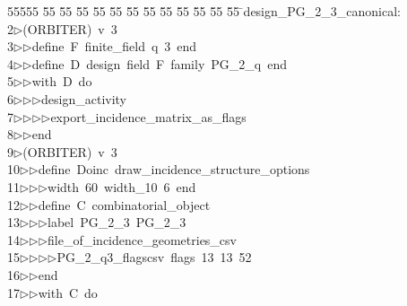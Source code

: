 %
%
\begin{tabbing}
55555 \= 55 \= 55 \= 55 \= 55 \= 55 \= 55 \= 55 \= 55 \= 55 \= 55 \= 55 \= 55 \= \>design\_PG\_2\_3\_canonical:\ \\[0pt]
2\>$\triangleright$\>(ORBITER)\ v\ 3\ \\[0pt]
3\>$\triangleright$\>$\triangleright$\>define\ F\ finite\_field\ q\ 3\ end\ \\[0pt]
4\>$\triangleright$\>$\triangleright$\>define\ D\ design\ field\ F\ family\ PG\_2\_q\ end\ \\[0pt]
5\>$\triangleright$\>$\triangleright$\>with\ D\ do\ \\[0pt]
6\>$\triangleright$\>$\triangleright$\>$\triangleright$\>design\_activity\ \\[0pt]
7\>$\triangleright$\>$\triangleright$\>$\triangleright$\>$\triangleright$\>export\_incidence\_matrix\_as\_flags\ \\[0pt]
8\>$\triangleright$\>$\triangleright$\>end\\[0pt]
9\>$\triangleright$\>(ORBITER)\ v\ 3\ \\[0pt]
10\>$\triangleright$\>$\triangleright$\>define\ Doinc\ draw\_incidence\_structure\_options\ \\[0pt]
11\>$\triangleright$\>$\triangleright$\>$\triangleright$\>width\ 60\ width\_10\ 6\ end\ \\[0pt]
12\>$\triangleright$\>$\triangleright$\>define\ C\ combinatorial\_object\ \\[0pt]
13\>$\triangleright$\>$\triangleright$\>$\triangleright$\>label\ PG\_2\_3\ PG\_2\_3\ \\[0pt]
14\>$\triangleright$\>$\triangleright$\>$\triangleright$\>file\_of\_incidence\_geometries\_csv\ \\[0pt]
15\>$\triangleright$\>$\triangleright$\>$\triangleright$\>$\triangleright$\>PG\_2\_q3\_flagscsv\ flags\ 13\ 13\ 52\ \\[0pt]
16\>$\triangleright$\>$\triangleright$\>end\ \\[0pt]
17\>$\triangleright$\>$\triangleright$\>with\ C\ do\ \\[0pt]

\end{tabbing}
